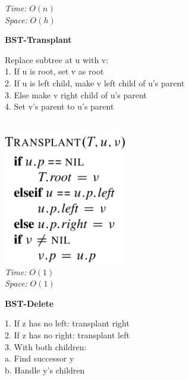 {\begin{minipage}[t]{1\textwidth}
\begin{minipage}[t]{0.19\textwidth}
        \textit{Time:} \(O(n)\)\\
        \textit{Space:} \(O(h)\)
    \end{minipage}
    \hfill
    \begin{minipage}[t]{0.19\textwidth}
        \centering
        \textbf{\scriptsize BST-Transplant}\\[2pt]
        \scriptsize
        \begin{minipage}[t]{\textwidth}
            \scriptsize
            Replace subtree at u with v:\\
            1. If u is root, set v as root\\
            2. If u is left child, make v left child of u's parent\\
            3. Else make v right child of u's parent\\
            4. Set v's parent to u's parent
        \end{minipage}\\[4pt]
        \includegraphics[width=0.4\textwidth]{images/bst-transplant.png}\\[2pt]
        \textit{Time:} \(O(1)\)\\
        \textit{Space:} \(O(1)\)
    \end{minipage}
    \hfill
    \begin{minipage}[t]{0.19\textwidth}
        \centering
        \textbf{\scriptsize BST-Delete}\\[2pt]
        \scriptsize
        \begin{minipage}[t]{\textwidth}
            \scriptsize
            1. If z has no left: transplant right\\
            2. If z has no right: transplant left\\
            3. With both children:\\
            \quad a. Find successor y\\
            \quad b. Handle y's children\\

\end{minipage}
\end{minipage}
\end{minipage}}
